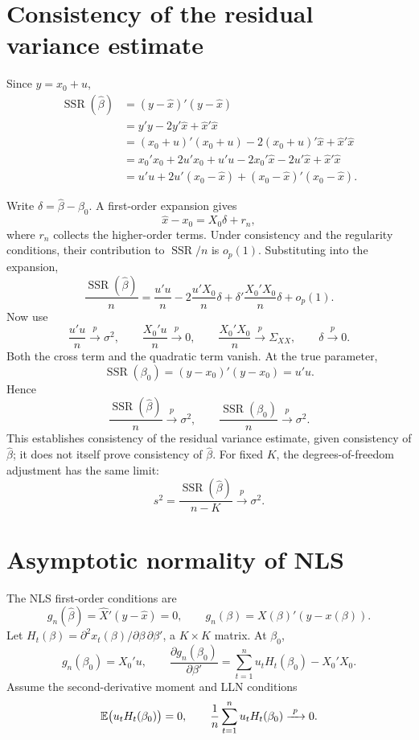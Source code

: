 \documentclass[11pt]{article}
\begin{document}
\section{Consistency of the residual variance estimate}

Since $y=x_{0}+u$,
\begin{align*}
 \operatorname{SSR}(\hat\beta)
 &= (y-\hat x)'(y-\hat x)\\
 &= y'y-2y'\hat x+\hat x'\hat x\\
 &= (x_{0}+u)'(x_{0}+u)-2(x_{0}+u)'\hat x+\hat x'\hat x\\
 &= x_{0}'x_{0}+2u'x_{0}+u'u-2x_{0}'\hat x-2u'\hat x+\hat x'\hat x\\
 &= u'u+2u'(x_{0}-\hat x)+(x_{0}-\hat x)'(x_{0}-\hat x).
\end{align*}

Write $\delta=\hat\beta-\beta_{0}$. A first-order expansion gives
\[ \hat x-x_{0}=X_{0}\delta+r_{n}, \]
where $r_{n}$ collects the higher-order terms. Under consistency and the
regularity conditions, their contribution to $\operatorname{SSR}/n$ is $o_{p}(1)$.
Substituting into the expansion,
\[ \frac{\operatorname{SSR}(\hat\beta)}{n}
   =\frac{u'u}{n}-2\frac{u'X_{0}}{n}\delta
     +\delta'\frac{X_{0}'X_{0}}{n}\delta+o_{p}(1). \]
Now use
\[ \frac{u'u}{n}\xrightarrow{\ p\ }\sigma^{2}, \qquad
   \frac{X_{0}'u}{n}\xrightarrow{\ p\ }0, \qquad
   \frac{X_{0}'X_{0}}{n}\xrightarrow{\ p\ }\Sigma_{XX}, \qquad
   \delta\xrightarrow{\ p\ }0. \]
Both the cross term and the quadratic term vanish. At the true parameter,
\[ \operatorname{SSR}(\beta_{0})=(y-x_{0})'(y-x_{0})=u'u. \]
Hence
\[ \boxed{\frac{\operatorname{SSR}(\hat\beta)}{n}\xrightarrow{\ p\ }\sigma^{2}},
   \qquad \frac{\operatorname{SSR}(\beta_{0})}{n}\xrightarrow{\ p\ }\sigma^{2}. \]
This establishes consistency of the residual variance estimate, given
consistency of $\hat\beta$; it does not itself prove consistency of $\hat\beta$.
For fixed $K$, the degrees-of-freedom adjustment has the same limit:
\[ s^{2}=\frac{\operatorname{SSR}(\hat\beta)}{n-K}\xrightarrow{\ p\ }\sigma^{2}. \]

\section{Asymptotic normality of NLS}

The NLS first-order conditions are
\[ g_{n}(\hat\beta)=\hat X'(y-\hat x)=0, \qquad
   g_{n}(\beta)=X(\beta)'(y-x(\beta)). \]
Let $H_{t}(\beta)=\partial^{2}x_{t}(\beta)/\partial\beta\,\partial\beta'$,
a $K\times K$ matrix. At $\beta_{0}$,
\[ g_{n}(\beta_{0})=X_{0}'u, \qquad
   \frac{\partial g_{n}(\beta_{0})}{\partial\beta'}
      =\sum_{t=1}^{n}u_{t}H_{t}(\beta_{0})-X_{0}'X_{0}. \]
Assume the second-derivative moment and LLN conditions
\[ \E\bigl(u_{t}H_{t}(\beta_{0})\bigr)=0, \qquad
   \frac{1}{n}\sum_{t=1}^{n}u_{t}H_{t}(\beta_{0})\xrightarrow{\ p\ }0. \]
\end{document}
